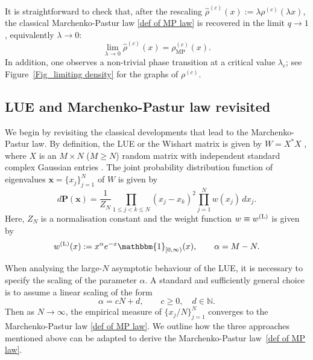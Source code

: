 \documentclass{amsart}
\theoremstyle{plain}
\theoremstyle{remark}
\numberwithin{equation}{section}
\begin{document}
It is straightforward to check that, after the rescaling  $   \widehat{\rho}^{(c)}(x):= \lambda \rho^{(c)}(\lambda x)$, the classical Marchenko-Pastur law \eqref{def of MP law} is recovered in the 
limit \(q \to 1\), equivalently \(\lambda \to 0\):
 \begin{equation} \label{qMP to MP}
        \lim_{\lambda\rightarrow0}\widehat{\rho}^{(c)}(x)=\rho _{\mathrm {MP}}^{(c)}(x).
\end{equation}
In addition, one observes a non-trivial phase transition at a critical value $\lambda_c$; see Figure~\ref{Fig_limiting density} for the graphs of $\rho^{(c)}$.  

\subsection{LUE and Marchenko-Pastur law revisited}

We begin by revisiting the classical developments that lead to the 
Marchenko-Pastur law. By definition, the LUE or the Wishart matrix is given by $W = X^{*}X$ \cite[Chapter 3]{Fo10}, where $X$ is an $M \times N$ ($M \geq N$) random matrix with independent standard complex Gaussian entries \cite{BF25}. 
The joint probability distribution function of eigenvalues $\mathbf{x}=\{x_j\}_{j=1}^N$ of $W$ is given by
\begin{equation}\label{def of joint eigenvalue of unitary ensemble}
    d\mathbf{P}(\mathbf{x})= \frac{1}{Z_{N}} \prod_{1\leq j<k\leq N}(x_{j}-x_{k})^{2}\prod_{j=1}^{N}w(x_j) \,dx_{j}. 
\end{equation}
Here, $Z_N$ is a normalisation constant and the weight function $w \equiv w^{ \rm (L) }$ is given by 
\begin{equation}\label{def of Laguerre weight}
    w^{(\mathrm L)}(x):=x^{\alpha}e^{-x}\mathbbm{1}_{[0,\infty)}(x), \qquad \alpha=M-N. 
\end{equation} 

When analysing the large-$N$ asymptotic behaviour of the LUE, it is necessary to specify the scaling of the parameter $\alpha$. 
A standard and sufficiently general choice is to assume a linear scaling of the form
\begin{equation}\label{def of alpha scaling}
    \alpha = cN + d, \qquad c \geq 0,\quad d \in \mathbb{N}.
\end{equation} 
Then as $N \to \infty$, the empirical measure of $\{x_j/N\}_{j=1}^N$ converges to the Marchenko-Pastur law \eqref{def of MP law}. 
We outline how the three approaches mentioned above can be adapted to derive the Marchenko-Pastur law~\eqref{def of MP law}.
\end{document}
